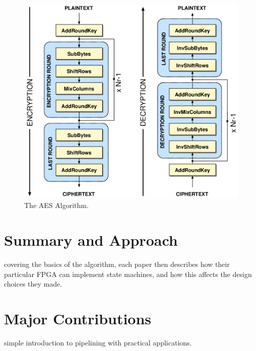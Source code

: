 \documentclass[journal,twocolumn]{IEEEtran}
\begin{document}
\begin{figure}
\begin{center}
\includegraphics[scale=0.4]{aes_algo.png}
\caption{The AES Algorithm.}
\label{fig_aes_algo}
\end{center}
\end{figure}

\section{Summary and Approach}

 covering the basics of the algorithm, each paper then
describes how their particular FPGA can implement state machines, and how this
affects the design choices they made.

\section{Major Contributions}

 simple introduction to pipelining with practical applications.

\end{document}

